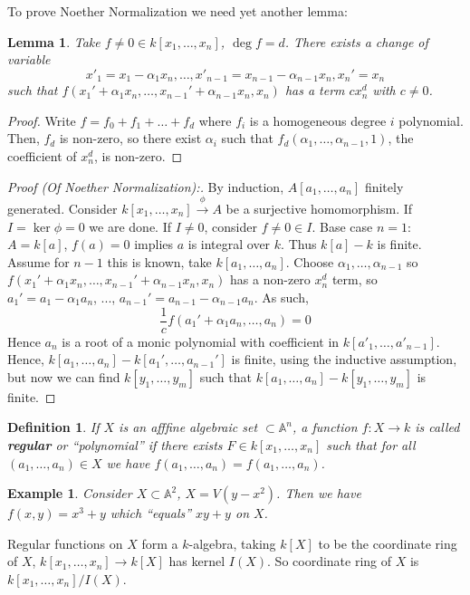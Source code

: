 \documentclass[12pt]{article}
\newcommand{\A}{\mathbb{A}}
\newtheorem{definition}{Definition}
\newtheorem{example}[]{Example}
\newtheorem{lemma}{Lemma}
\begin{document}
    To prove Noether Normalization we need yet another lemma:
    \begin{lemma}
        Take $f \neq 0 \in k[x_1, \dots, x_n]$, $\deg f = d$. There exists a change of variable
         $$x'_1 = x_1 - \alpha_1 x_n, \dots, x'_{n-1} = x_{n-1} - \alpha_{n-1}x_n, x_n' = x_n$$
        such that $f(x_1' + \alpha_1x_n, \dots, x_{n-1}'+\alpha_{n-1}x_n, x_n)$ has a term $cx^d_n$ with $c \neq 0$.  
    \end{lemma}
    \begin{proof}
        Write $f = f_0 + f_1 + \dots + f_d$ where $f_i$ is a homogeneous degree $i$ polynomial. Then, $f_d$ is non-zero, so there exist $\alpha_i$ such that $f_d(\alpha_1, \dots, \alpha_{n-1}, 1)$, the coefficient of $x^d_n$, is non-zero.  
    \end{proof}
    \begin{proof}
        [Proof (Of Noether Normalization):] By induction, $A[a_1, \dots, a_n]$ finitely generated. Consider $k[x_1, \dots, x_n] \xrightarrow{\phi} A$ be a surjective homomorphism. If $I = \ker \phi = 0$ we are done. If $I \neq 0$, consider $f \neq 0 \in I$. Base case $n=1$: $A = k[a]$, $f(a) = 0$ implies $a$ is integral over $k$. Thus $k[a] - k$ is finite. Assume for $n-1$ this is known, take $k[a_1, \dots, a_n]$. Choose $\alpha_1, \dots, \alpha_{n-1}$ so $f(x_1' + \alpha_1x_n, \dots, x_{n-1}'+\alpha_{n-1}x_n, x_n)$ has a non-zero $x_n^d$ term, so $a_1' = a_1 - \alpha_1a_n$, ..., $a_{n-1}' = a_{n-1} - \alpha_{n-1}a_n$. As such, 
        $$\frac{1}{c}f(a_1' + \alpha_1a_n, \dots, a_n) = 0$$
        Hence $a_n$ is a root of a monic polynomial with coefficient in $k[a'_1, \dots, a'_{n-1}]$. Hence, $k[a_1, \dots, a_n] - k[a_1', \dots, a_{n-1}']$ is finite, using the inductive assumption, but now we can find $k[y_1, \dots, y_m]$ such that $k[a_1, \dots, a_n] - k[y_1, \dots, y_m]$ is finite. 
    \end{proof}
    \begin{definition}
        If $X$ is an afffine algebraic set $\subset \A^n$, a function $f: X \to k$ is called \textbf{regular} or ``polynomial'' if there exists $F \in k[x_1, \dots, x_n]$ such that for all $(a_1, \dots, a_n) \in X$ we have $f(a_1, \dots, a_n) = f(a_1, \dots, a_n)$.  
    \end{definition}
    \begin{example}
        Consider $X \subset \A^2$, $X = V(y-x^2)$. Then we have $f(x, y) = x^3 + y$ which ``equals'' $xy + y$ on $X$. 
    \end{example}
    Regular functions on $X$ form a $k$-algebra, taking $k[X]$ to be the coordinate ring of $X$, $k[x_1, \dots, x_n] \to k[X]$ has kernel $I(X)$. So coordinate ring of $X$ is $k[x_1, \dots, x_n]/I(X)$. 
\end{document}
